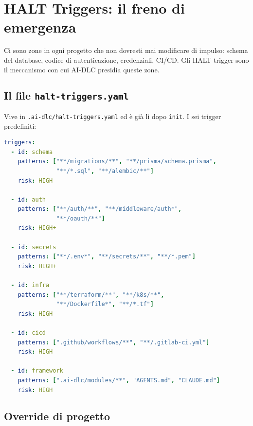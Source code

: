 ﻿%

\chapter{HALT Triggers: il freno di emergenza}
\label{ch:halt-triggers}

Ci sono zone in ogni progetto che non dovresti mai modificare di impulso: schema del database, codice di autenticazione, credenziali, CI/CD. Gli HALT trigger sono il meccanismo con cui AI-DLC presidia queste zone.

\section{Il file \texttt{halt-triggers.yaml}}
\label{sec:10-file}

Vive in \texttt{.ai-dlc/halt-triggers.yaml} ed è già lì dopo \texttt{init}. I sei trigger predefiniti:

\begin{lstlisting}[language=yaml,caption={Trigger predefiniti in halt-triggers.yaml}]
triggers:
  - id: schema
    patterns: ["**/migrations/**", "**/prisma/schema.prisma",
               "**/*.sql", "**/alembic/**"]
    risk: HIGH

  - id: auth
    patterns: ["**/auth/**", "**/middleware/auth*",
               "**/oauth/**"]
    risk: HIGH+

  - id: secrets
    patterns: ["**/.env*", "**/secrets/**", "**/*.pem"]
    risk: HIGH+

  - id: infra
    patterns: ["**/terraform/**", "**/k8s/**",
               "**/Dockerfile*", "**/*.tf"]
    risk: HIGH

  - id: cicd
    patterns: [".github/workflows/**", "**/.gitlab-ci.yml"]
    risk: HIGH

  - id: framework
    patterns: [".ai-dlc/modules/**", "AGENTS.md", "CLAUDE.md"]
    risk: HIGH
\end{lstlisting}


\section{Override di progetto}
\label{sec:10-override}

